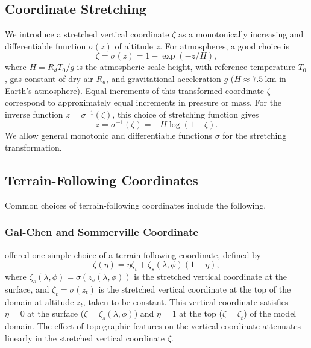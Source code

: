 \documentclass{report}
\begin{document}
\subsection{Coordinate Stretching} We introduce a stretched vertical coordinate $\zeta$ as a monotonically increasing and differentiable function $\sigma(z)$ of altitude $z$. For atmospheres, a good choice is 
\begin{equation}
    \zeta = \sigma(z) = 1 - \exp(-z/H),
\end{equation}
where $H = R_d T_0/g$ is the atmospheric scale height, with reference temperature $T_0$, gas constant of dry air $R_d$, and gravitational acceleration $g$ ($H \approx 7.5~\mathrm{km}$ in Earth's atmosphere). Equal increments of this transformed coordinate $\zeta$ correspond to approximately equal increments in pressure or mass. For the inverse function $z = \sigma^{-1}(\zeta)$, this choice of stretching function gives
\begin{equation}
    z = \sigma^{-1}(\zeta) = - H \log(1-\zeta).
\end{equation}
We allow general monotonic and differentiable functions $\sigma$ for the stretching transformation. 

\subsection{Terrain-Following Coordinates}

Common choices of terrain-following coordinates include the following.

\subsubsection{Gal-Chen and Sommerville Coordinate} \citet{Gal-Chen75a} offered one simple choice of a terrain-following coordinate, defined by 
\begin{equation}\label{e:Gal-Chen}
    \zeta(\eta) = \eta \zeta_t + \zeta_s(\lambda, \phi)(1 - \eta),
\end{equation}
where $\zeta_s(\lambda, \phi) = \sigma(z_s(\lambda, \phi))$ is the stretched vertical coordinate at the surface, and $\zeta_t = \sigma(z_t)$ is the stretched vertical coordinate at the top of the domain at altitude $z_t$, taken to be constant. This vertical coordinate satisfies $\eta = 0$ at the surface ($\zeta=\zeta_s(\lambda, \phi)$) and $\eta = 1$ at the top ($\zeta=\zeta_t$) of the model domain. The effect of topographic features on the vertical coordinate attenuates linearly in the stretched vertical coordinate $\zeta$. 
\end{document}
